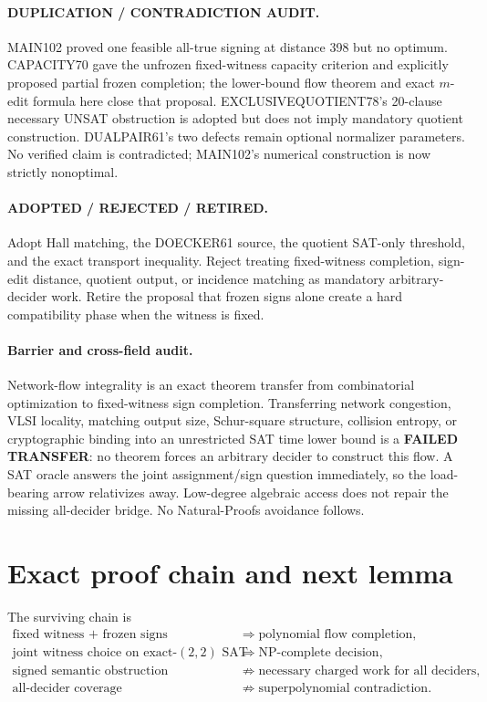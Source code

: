 \documentclass[11pt]{article}
\begin{document}
\paragraph{DUPLICATION / CONTRADICTION AUDIT.}
MAIN102 proved one feasible all-true signing at distance 398 but no optimum.  CAPACITY70
gave the unfrozen fixed-witness capacity criterion and explicitly proposed partial frozen
completion; the lower-bound flow theorem and exact $m$-edit formula here close that proposal.
EXCLUSIVEQUOTIENT78's 20-clause necessary UNSAT obstruction is adopted but does not imply
mandatory quotient construction.  DUALPAIR61's two defects remain optional normalizer
parameters.  No verified claim is contradicted; MAIN102's numerical construction is now
strictly nonoptimal.

\paragraph{ADOPTED / REJECTED / RETIRED.}
Adopt Hall matching, the DOECKER61 source, the quotient SAT-only threshold, and the exact
transport inequality.  Reject treating fixed-witness completion, sign-edit distance,
quotient output, or incidence matching as mandatory arbitrary-decider work.  Retire the
proposal that frozen signs alone create a hard compatibility phase when the witness is fixed.

\paragraph{Barrier and cross-field audit.}
Network-flow integrality is an exact theorem transfer from combinatorial optimization to
fixed-witness sign completion.  Transferring network congestion, VLSI locality, matching
output size, Schur-square structure, collision entropy, or cryptographic binding into an
unrestricted SAT time lower bound is a \textbf{FAILED TRANSFER}: no theorem forces an
arbitrary decider to construct this flow.  A SAT oracle answers the joint assignment/sign
question immediately, so the load-bearing arrow relativizes away.  Low-degree algebraic
access does not repair the missing all-decider bridge.  No Natural-Proofs avoidance follows.

\section{Exact proof chain and next lemma}

The surviving chain is
\[
\begin{aligned}
\text{fixed witness + frozen signs}
&\Longrightarrow \text{polynomial flow completion},\\
\text{joint witness choice on exact-$(2,2)$ SAT}
&\Longrightarrow \text{NP-complete decision},\\
\text{signed semantic obstruction}
&\not\Longrightarrow \text{necessary charged work for all deciders},\\
\text{all-decider coverage}
&\not\Longrightarrow \text{superpolynomial contradiction}.
\end{aligned}
\]
\end{document}
